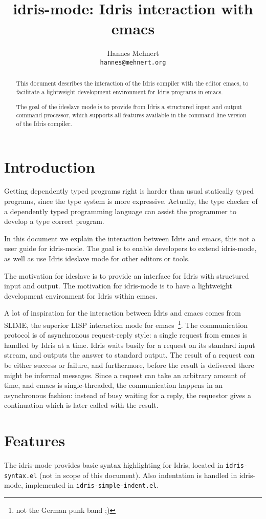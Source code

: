 \documentclass{article}
\title{idris-mode: Idris interaction with emacs}
\author{Hannes Mehnert\\\texttt{hannes@mehnert.org}}
\begin{document}
\sloppy
\maketitle

\begin{abstract}
This document describes the interaction of the Idris compiler with the editor emacs, to facilitate a lightweight development environment for Idris programs in emacs.

The goal of the ideslave mode is to provide from Idris a structured input and output command processor, which supports all features available in the command line version of the Idris compiler.
\end{abstract}

\section{Introduction}
Getting dependently typed programs right is harder than usual statically typed programs, since the type system is more expressive.
Actually, the type checker of a dependently typed programming language can assist the programmer to develop a type correct program.

In this document we explain the interaction between Idris and emacs, this not a user guide for idris-mode.
The goal is to enable developers to extend idris-mode, as well as use Idris ideslave mode for other editors or tools.

The motivation for ideslave is to provide an interface for Idris with structured input and output.
The motivation for idris-mode is to have a lightweight development environment for Idris within emacs.

A lot of inspiration for the interaction between Idris and emacs comes from SLIME, the superior LISP interaction mode for emacs~\footnote{not the German punk band ;)}.
The communication protocol is of asynchronous request-reply style: a single request from emacs is handled by Idris at a time.
Idris waits busily for a request on its standard input stream, and outputs the answer to standard output.
The result of a request can be either success or failure, and furthermore, before the result is delivered there might be informal messages.
Since a request can take an arbitrary amount of time, and emacs is single-threaded, the communication happens in an asynchronous fashion: instead of busy waiting for a reply, the requestor gives a continuation which is later called with the result.

\section{Features}
The idris-mode provides basic syntax highlighting for Idris, located in \texttt{idris-syntax.el} (not in scope of this document).
Also indentation is handled in idris-mode, implemented in \texttt{idris-simple-indent.el}.
\end{document}
